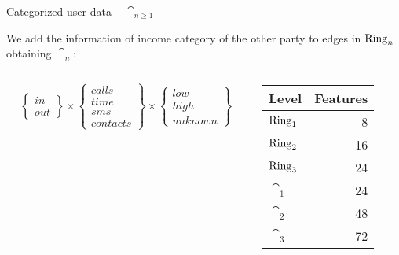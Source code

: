 \documentclass[usenames,dvipsnames]{beamer}
\begin{document}
\begin{frame}{Categorized user data -- $\cat_{n \geq 1}$}

We add the information of income category of the other party to 
edges in $\operatorname{Ring}_{n}$ obtaining $\cat_n$:

\begin{columns}
\begin{column}{0.6\textwidth}
\begin{equation*}
\begin{Bmatrix} in \\ out \end{Bmatrix}
\times
\begin{Bmatrix} calls \\ time \\ sms \\ contacts \end{Bmatrix}
\times
\begin{Bmatrix} low \\ high \\ unknown \end{Bmatrix}
\label{eq:matcatuserdata}
\end{equation*}
\end{column}
\begin{column}{0.4\textwidth}
\begin{table}[t]
\begin{tabular}{>{\bfseries}l r}
\toprule
Level & Features \\
\midrule
$\operatorname{Ring}_1$ & \num{8}  \\
$\operatorname{Ring}_2$ & \num{16} \\
$\operatorname{Ring}_3$ & \num{24} \\
$\cat_1$ & \num{24} \\
$\cat_2$ & \num{48} \\
$\cat_3$ & \num{72} \\
\bottomrule
\end{tabular}
\end{table}
\end{column}
\end{columns}

\end{frame}
\end{document}
